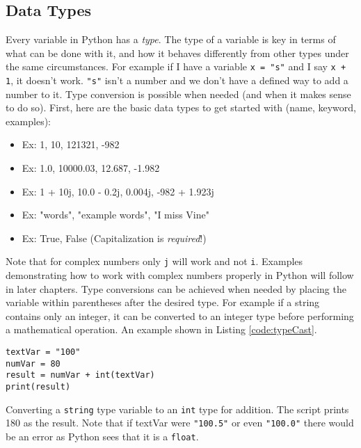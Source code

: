 \documentclass[oneside]{book}
\begin{document}
\subsection{Data Types}\label{sec:dataTypes}
Every variable in Python has a \textit{type}. The type of a variable is key in terms of what can be done with it, and how it behaves differently from other types under the same circumstances. For example if I have a variable \texttt{x = "s"} and I say \texttt{x + 1}, it doesn't work. \texttt{"s"} isn't a number and we don't have a defined way to add a number to it. Type conversion is possible when needed (and when it makes sense to do so). First, here are the basic data types to get started with (name, keyword, examples):

\begin{itemize}
\item{  Ex: 1, 10, 121321, -982}
\item{  Ex: 1.0, 10000.03, 12.687, -1.982}
\item{  Ex: 1 + 10j, 10.0 - 0.2j, 0.004j, -982 + 1.923j}
\item{  Ex: "words", "example words", "I miss Vine"}
\item{  Ex: True, False (Capitalization is \textit{required}!)}
\end{itemize}

Note that for complex numbers only \texttt{j} will work and not \texttt{i}. Examples demonstrating how to work with complex numbers properly in Python will follow in later chapters. Type conversions can be achieved when needed by placing the variable within parentheses after the desired type. For example if a string contains only an integer, it can be converted to an integer type before performing a mathematical operation. An example shown in Listing \ref{code:typeCast}.

\begin{listing}[htb]
\begin{mdframed}[backgroundcolor=codebg]
\begin{verbatim}
textVar = "100"
numVar = 80
result = numVar + int(textVar)
print(result)
\end{verbatim}
\end{mdframed}
\caption{Converting a \texttt{string} type variable to an \texttt{int} type for addition. The script prints 180 as the result. Note that if textVar were \texttt{"100.5"} or even \texttt{"100.0"} there would be an error as Python sees that it is a \texttt{float}.}
\label{code:typeCast}
\end{listing}
\end{document}
